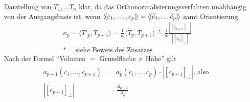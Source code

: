 \begin{beweis}
Darstellung von \(T_1, \ldots T_n \) klar, da das Orthonormalisierungsverfahren unabhängig von der Ausgangsbasis ist, wenn \( \left\langle\!\left\langle c_1, \ldots , c_p \right\rangle\!\right\rangle = \left\langle\!\left\langle \widetilde c_1, \dots \widetilde c_p \right\rangle\!\right\rangle\) samt Orientierung
\begin{align*}
 \kappa_p = \langle T'_p, T_{p+1} \rangle = \frac{1}{w} \langle \dot T_p, T_{p+1} \rangle \stackrel{\ast}{=} \frac{1}{w} \frac{|\left[c_{p+1} \right]_\perp|}{|\left[c_p \right]_\perp|}\\
 \ast = \text{siehe Beweis des Zusatzes}
\end{align*}
Nach der Formel "`Volumen \(=\) Grundfläche \(\times\) Höhe"' gilt
\begin{align*}
  a_{p+1} (c_1, \dots , c_{p+1}) &= a_p \left(c_1, \dots , c_p \right) \cdot \left|\left[c_{p+1}\right]_\perp\right| \text{, also } \\
  \left|\left[c_{p+1}\right]_\perp\right| &= \frac{A_{p+1}}{A_p}
\end{align*}
\end{beweis}